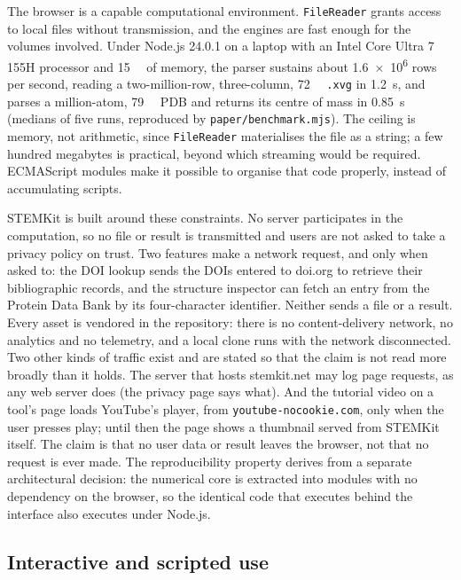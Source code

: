 \documentclass[11pt,a4paper]{article}
\begin{document}
The browser is a capable computational environment. \texttt{FileReader} grants
access to local files without transmission, and the engines are fast enough for the volumes involved. Under Node.js 24.0.1 on a
laptop with an Intel Core Ultra 7 155H processor and \SI{15}{\giga\byte} of
memory, the parser sustains about \num{1.6e6} rows per second, reading a
two-million-row, three-column, \SI{72}{\mega\byte} \texttt{.xvg} in
\SI{1.2}{\second}, and parses a million-atom, \SI{79}{\mega\byte} PDB and
returns its centre of mass in \SI{0.85}{\second} (medians of five runs,
reproduced by \texttt{paper/benchmark.mjs}). The ceiling is memory,
not arithmetic, since \texttt{FileReader} materialises the file as a string; a
few hundred megabytes is practical, beyond which streaming would be required.
ECMAScript modules make it possible to organise that code properly, instead of
accumulating scripts.

STEMKit is built around these constraints. No server participates in the
computation, so no file or result is transmitted and users are not asked to take
a privacy policy on trust. Two features make a network request, and only when
asked to: the DOI lookup sends the DOIs entered to doi.org to retrieve their
bibliographic records, and the structure inspector can fetch an entry from the
Protein Data Bank by its four-character identifier. Neither sends a file or a
result. Every asset is vendored in the repository: there is no
content-delivery network, no analytics and no telemetry, and a local clone runs
with the network disconnected. Two other kinds of traffic exist and are stated
so that the claim is not read more broadly than it holds. The server that hosts
stemkit.net may log page requests, as any web server does (the privacy page says
what). And the tutorial video on a tool's page loads YouTube's player, from
\texttt{youtube-nocookie.com}, only when the user presses play; until then the
page shows a thumbnail served from STEMKit itself. The claim is that no user data
or result leaves the browser, not that no request is ever made. The
reproducibility property
derives from a separate architectural decision: the numerical core is extracted
into modules with no dependency on the browser, so the identical code that
executes behind the interface also executes under Node.js.

\subsection{Interactive and scripted use}
\end{document}
